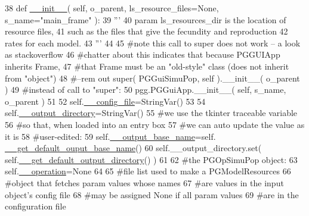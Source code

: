 \begin{DoxyCode}
38     \textcolor{keyword}{def }\hyperlink{classpgguisimupop_1_1PGGuiSimuPop_a1e7961c0727c5085f0e592a6d82a4282}{\_\_init\_\_}( self,  o\_parent, ls\_resource\_files=None, s\_name="main\_frame" ):
39         \textcolor{stringliteral}{'''}
40 \textcolor{stringliteral}{        param ls\_resources\_dir is the location of resource files,}
41 \textcolor{stringliteral}{        such as the files that give the fecundity and reproduction}
42 \textcolor{stringliteral}{        rates for each model.  }
43 \textcolor{stringliteral}{        '''}
44 
45         \textcolor{comment}{#note this call to super does not work -- a look as stackoverflow}
46         \textcolor{comment}{#chatter about this indicates that because PGGUIApp inherits Frame,}
47         \textcolor{comment}{#that Frame must be an "old-style" class (does not inherit from "object")}
48         \textcolor{comment}{#--rem out super( PGGuiSimuPop, self ).\_\_init\_\_( o\_parent )}
49         \textcolor{comment}{#instead of call to "super":}
50         pgg.PGGuiApp.\_\_init\_\_( self, s\_name, o\_parent )
51 
52         self.\hyperlink{classpgguisimupop_1_1PGGuiSimuPop_a3163881d6fafdda55c38f26de3c4d006}{\_\_config\_file}=StringVar()
53 
54         self.\hyperlink{classpgguisimupop_1_1PGGuiSimuPop_a34fa159417c243f57c084d43ccb1b17c}{\_\_output\_directory}=StringVar()
55         \textcolor{comment}{#we use the tkinter traceable variable}
56         \textcolor{comment}{#so that, when loaded into an entry box}
57         \textcolor{comment}{#we can auto update the value as it is }
58         \textcolor{comment}{#user-edited:}
59         self.\hyperlink{classpgguisimupop_1_1PGGuiSimuPop_a8c48e064be333b43a15b1a7e52946642}{\_\_output\_base\_name}=self.
      \hyperlink{classpgguisimupop_1_1PGGuiSimuPop_af83fda46956ca2f6cd8f20f8f965c167}{\_\_get\_default\_ouput\_base\_name}() 
60         self.\_\_output\_directory.set( self.\hyperlink{classpgguisimupop_1_1PGGuiSimuPop_a02ba9eadfa674bc7c177e30fc0ae6e00}{\_\_get\_default\_output\_directory}() )
61 
62         \textcolor{comment}{#the PGOpSimuPop object:}
63         self.\hyperlink{classpgguisimupop_1_1PGGuiSimuPop_aa4ac11b6f725cd08e2d0c2896035cd80}{\_\_operation}=\textcolor{keywordtype}{None}
64 
65         \textcolor{comment}{#file list used to make a PGModelResources }
66         \textcolor{comment}{#object that fetches param values whose names}
67         \textcolor{comment}{#are values in the input object's config file}
68         \textcolor{comment}{#may be assigned None if all param values}
69         \textcolor{comment}{#are in the configuration file}

\end{DoxyCode}
